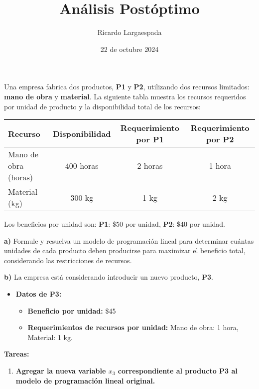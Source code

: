 \documentclass{article}
\title{Análisis Postóptimo}
\author{Ricardo Largaespada}
\date{22 de octubre 2024}
\begin{document}
\maketitle

\begin{problem}
Una empresa fabrica dos productos, \textbf{P1} y \textbf{P2}, utilizando dos recursos limitados: \textbf{mano de obra} y \textbf{material}. La siguiente tabla muestra los recursos requeridos por unidad de producto y la disponibilidad total de los recursos:

\begin{center}
\begin{tabular}{lccc}
\toprule
\textbf{Recurso} & \textbf{Disponibilidad} & \textbf{Requerimiento por P1} & \textbf{Requerimiento por P2} \\
\midrule
Mano de obra (horas) & 400 horas & 2 horas & 1 hora \\
Material (kg)        & 300 kg    & 1 kg    & 2 kg  \\
\bottomrule
\end{tabular}
\end{center}

Los beneficios por unidad son: \textbf{P1}: \$50 por unidad, \textbf{P2}: \$40 por unidad.

\textbf{a)} Formule y resuelva un modelo de programación lineal para determinar cuántas unidades de cada producto deben producirse para maximizar el beneficio total, considerando las restricciones de recursos.

\textbf{b)} La empresa está considerando introducir un nuevo producto, \textbf{P3}.

\begin{itemize}
    \item \textbf{Datos de P3:}
    \begin{itemize}
        \item \textbf{Beneficio por unidad:} \$45
        \item \textbf{Requerimientos de recursos por unidad:} Mano de obra: 1 hora, Material: 1 kg.
    \end{itemize}
\end{itemize}

\textbf{Tareas:}

\begin{enumerate}
    \item \textbf{Agregar la nueva variable \( x_3 \) correspondiente al producto P3 al modelo de programación lineal original.}


\end{enumerate}
\end{problem}
\end{document}
